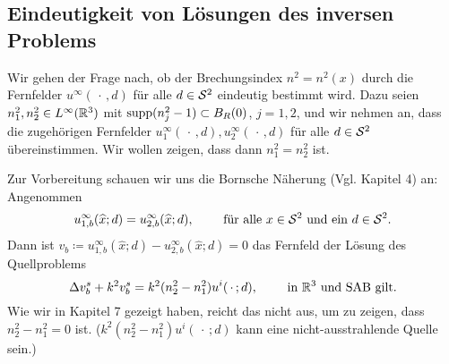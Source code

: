 \setcounter{subsection}{9}
\setcounter{section}{10}
\setcounter{mydef}{0}
\setcounter{equation}{0}

\subsection{Eindeutigkeit von Lösungen des inversen Problems}
Wir gehen der Frage nach, ob der Brechungsindex \(n^2=n^2(x)\) durch die Fernfelder \(u^\infty(\,\cdot\,,d)\) für alle \(d\in\mathcal{S}^2\) eindeutig bestimmt wird. Dazu seien \(n_1^2,n_2^2\in L^\infty(\mathbb{R}^3)\) mit \(\operatorname{supp}(n_j^2-1)\subset B_R(0)\), \(j=1,2\), und wir nehmen an, dass die zugehörigen Fernfelder \(u_1^\infty(\,\cdot\,,d), u_2^\infty(\,\cdot\,,d)\) für alle \(d\in\mathcal{S}^2\) übereinstimmen. Wir wollen zeigen, dass dann \(n_1^2=n_2^2\) ist.\vspace{1.5mm}

Zur Vorbereitung schauen wir uns die Bornsche Näherung (Vgl. Kapitel 4) an: Angenommen
\begin{equation*}
	u_{1,b}^\infty(\widehat{x};d)=u_{2,b}^\infty(\widehat{x};d),\qquad\text{ für alle }x\in\mathcal{S}^2\text{ und ein }d\in\mathcal{S}^2.
\end{equation*}
Dann ist \(v_b\coloneqq u_{1,b}^\infty(\widehat{x};d)-u_{2,b}^\infty(\widehat{x};d)=0\) das Fernfeld der Lösung des Quellproblems
\begin{equation*}
	\Delta v_b^s+k^2v_b^s=k^2(n_2^2-n_1^2)u^i(\,\cdot\,;d),\qquad\text{ in }\mathbb{R}^3\text{ und SAB gilt.}
\end{equation*}
Wie wir in Kapitel 7 gezeigt haben, reicht das nicht aus, um zu zeigen, dass \(n_2^2-n_1^2=0\) ist. (\(k^2(n_2^2-n_1^2)u^i(\,\cdot\,;d)\) kann eine nicht-ausstrahlende Quelle sein.)\vspace{1.5mm}


